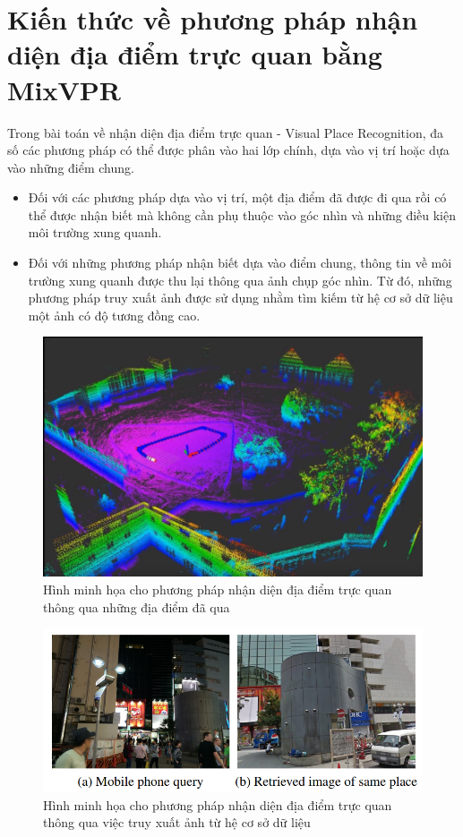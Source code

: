 \section{Kiến thức về phương pháp nhận diện địa điểm trực quan bằng MixVPR}
Trong bài toán về nhận diện địa điểm trực quan - Visual Place Recognition, đa số các phương pháp có thể được phân vào hai lớp chính, dựa vào vị trí hoặc dựa vào những điểm chung\cite{yin2022general}.
\begin{itemize}
    \item Đối với các phương pháp dựa vào vị trí, một địa điểm đã được đi qua rồi có thể được nhận biết mà không cần phụ thuộc vào góc nhìn và những điều kiện môi trường xung quanh.
    \item Đối với những phương pháp nhận biết dựa vào điểm chung, thông tin về môi trường xung quanh được thu lại thông qua ảnh chụp góc nhìn. Từ đó, những phương pháp truy xuất ảnh được sử dụng nhằm tìm kiếm từ hệ cơ sở dữ liệu một ảnh có độ tương đồng cao.
\end{itemize}
\begin{figure}[H]
    \centering
    \includegraphics[scale=0.4]{pics/Chapter3/position-based.png}
    \caption{Hình minh họa cho phương pháp nhận diện địa điểm trực quan thông qua những địa điểm đã qua \cite{slamposition}}
    \label{fig:enter-label}
\end{figure}
\begin{figure}[H]
    \centering
    \includegraphics[scale=0.7]{pics/Chapter3/overlap-based.png}
    \caption{Hình minh họa cho phương pháp nhận diện địa điểm trực quan thông qua việc truy xuất ảnh từ hệ cơ sở dữ liệu \cite{arandjelovic2016netvlad}}
    \label{fig:enter-label}
\end{figure}

